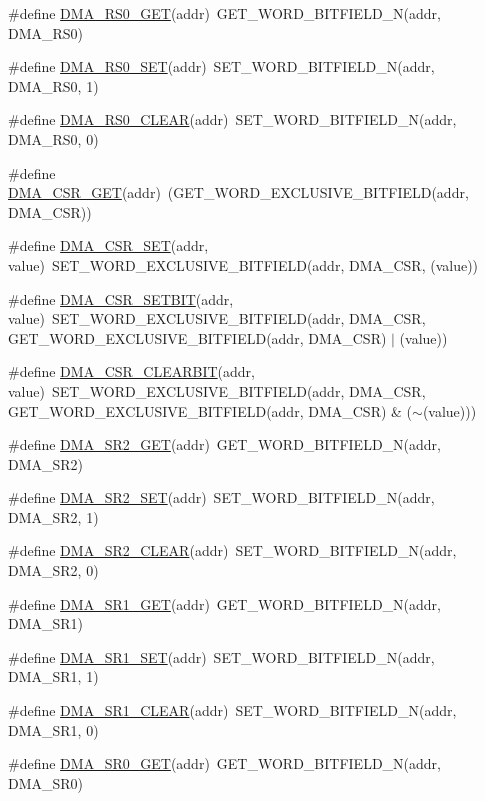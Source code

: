 \begin{DoxyCompactItemize}
\#define \hyperlink{a00548_a9c003228c85e73de0b8b08124317287c}{DMA\_\-RS0\_\-GET}(addr)~GET\_\-WORD\_\-BITFIELD\_\-N(addr, DMA\_\-RS0)
\item 
\#define \hyperlink{a00548_a405e50e0d82f06f31cc26bd6abb25aa1}{DMA\_\-RS0\_\-SET}(addr)~SET\_\-WORD\_\-BITFIELD\_\-N(addr, DMA\_\-RS0, 1)
\item 
\#define \hyperlink{a00548_ab1bef8eff2e945a03db0642820b23ba6}{DMA\_\-RS0\_\-CLEAR}(addr)~SET\_\-WORD\_\-BITFIELD\_\-N(addr, DMA\_\-RS0, 0)
\item 
\#define \hyperlink{a00548_ac6fba8704e4ad783344aa8a3459de1db}{DMA\_\-CSR\_\-GET}(addr)~(GET\_\-WORD\_\-EXCLUSIVE\_\-BITFIELD(addr, DMA\_\-CSR))
\item 
\#define \hyperlink{a00548_a39477dbaf722884857acb86eb854b3d1}{DMA\_\-CSR\_\-SET}(addr, value)~SET\_\-WORD\_\-EXCLUSIVE\_\-BITFIELD(addr, DMA\_\-CSR, (value))
\item 
\#define \hyperlink{a00548_a86f03526e65a0c94c41811b42b29502f}{DMA\_\-CSR\_\-SETBIT}(addr, value)~SET\_\-WORD\_\-EXCLUSIVE\_\-BITFIELD(addr, DMA\_\-CSR, GET\_\-WORD\_\-EXCLUSIVE\_\-BITFIELD(addr, DMA\_\-CSR) $|$ (value))
\item 
\#define \hyperlink{a00548_a3134019b92da9996f5e151ac91155dad}{DMA\_\-CSR\_\-CLEARBIT}(addr, value)~SET\_\-WORD\_\-EXCLUSIVE\_\-BITFIELD(addr, DMA\_\-CSR, GET\_\-WORD\_\-EXCLUSIVE\_\-BITFIELD(addr, DMA\_\-CSR) \& ($\sim$(value)))
\item 
\#define \hyperlink{a00548_a03df77af38fb3a79c6cb5f7f5f6f7be2}{DMA\_\-SR2\_\-GET}(addr)~GET\_\-WORD\_\-BITFIELD\_\-N(addr, DMA\_\-SR2)
\item 
\#define \hyperlink{a00548_a2883d819b72adb613c5ebfa2b41d400d}{DMA\_\-SR2\_\-SET}(addr)~SET\_\-WORD\_\-BITFIELD\_\-N(addr, DMA\_\-SR2, 1)
\item 
\#define \hyperlink{a00548_ae84ab428a3f36df085c382892929d627}{DMA\_\-SR2\_\-CLEAR}(addr)~SET\_\-WORD\_\-BITFIELD\_\-N(addr, DMA\_\-SR2, 0)
\item 
\#define \hyperlink{a00548_ae3221e389cb363ca48d3499b8bd0c341}{DMA\_\-SR1\_\-GET}(addr)~GET\_\-WORD\_\-BITFIELD\_\-N(addr, DMA\_\-SR1)
\item 
\#define \hyperlink{a00548_a41d19b9fc911cc3609371241f106d8e3}{DMA\_\-SR1\_\-SET}(addr)~SET\_\-WORD\_\-BITFIELD\_\-N(addr, DMA\_\-SR1, 1)
\item 
\#define \hyperlink{a00548_abb047fba877eb77ea1cc366961dde56a}{DMA\_\-SR1\_\-CLEAR}(addr)~SET\_\-WORD\_\-BITFIELD\_\-N(addr, DMA\_\-SR1, 0)
\item 
\#define \hyperlink{a00548_aba854eaaf11af9996e84b5b8b8b071a3}{DMA\_\-SR0\_\-GET}(addr)~GET\_\-WORD\_\-BITFIELD\_\-N(addr, DMA\_\-SR0)

\end{DoxyCompactItemize}
